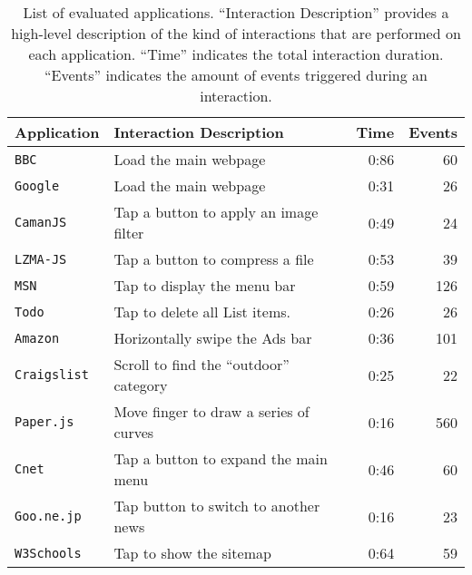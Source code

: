 
\begin{table}[p]
\large
\centering
\captionsetup{width=\columnwidth}
\caption{List of evaluated applications. ``Interaction Description'' provides a high-level description of the kind of interactions that are performed on each application. ``Time'' indicates the total interaction duration. ``Events'' indicates the amount of events triggered during an interaction.}
\renewcommand*{\arraystretch}{1.5}
\renewcommand*{\tabcolsep}{7pt}
\resizebox{\columnwidth}{!}
{  
\begin{tabular}{l l r r}
\toprule[0.15em]
\bigstrut\textbf{Application}  & \bigstrut\textbf{Interaction Description} & \bigstrut\textbf{Time}  & \bigstrut\textbf{Events} \\
\midrule[0.05em]
\texttt{BBC}          & Load the main webpage & 0:86    & 60 \\
\texttt{Google}       & Load the main webpage & 0:31    & 26\\
\texttt{CamanJS}   &   Tap a button to apply an image filter & 0:49    & 24\\
\texttt{LZMA-JS}    &  Tap a button to compress a file    & 0:53    & 39 \\
\texttt{MSN}         & Tap to display the menu bar & 0:59    & 126 \\
\texttt{Todo}         & Tap to delete all List items. & 0:26    & 26\\
\texttt{Amazon}       & Horizontally swipe the Ads bar & 0:36    & 101\\
\texttt{Craigslist}   & Scroll to find the ``outdoor'' category & 0:25    & 22\\
\texttt{Paper.js}     & Move finger to draw a series of curves &  0:16    & 560 \\
\texttt{Cnet}         & Tap a button to expand the main menu & 0:46    & 60 \\
\texttt{Goo.ne.jp}          & Tap button to switch to another news & 0:16    & 23 \\
\texttt{W3Schools}    & Tap to show the sitemap &  0:64    & 59 \\
\bottomrule[0.15em]
\end{tabular}
}
\label{tab:app_ebs}
\end{table}

